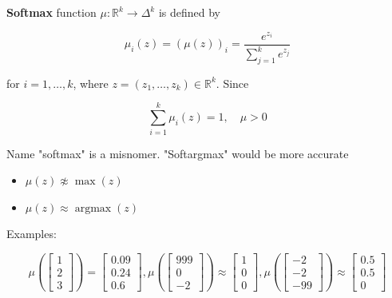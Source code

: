 \begin{definition}
    \textbf{Softmax} function $\mu: \mathbb{R}^{k} \rightarrow \Delta^{k}$ is defined by

    $$
    \mu_{i}(z)=(\mu(z))_{i}=\frac{e^{z_{i}}}{\sum_{j=1}^{k} e^{z_{j}}}
    $$

    for $i=1, \ldots, k$, where $z=\left(z_{1}, \ldots, z_{k}\right) \in \mathbb{R}^{k}$. Since

    $$
    \sum_{i=1}^{k} \mu_{i}(z)=1, \quad \mu>0
    $$

    Name "softmax" is a misnomer. "Softargmax" would be more accurate

    \begin{itemize}
        \item $\mu(z) \not \approx \max (z)$
        \item $\mu(z) \approx \operatorname{argmax}(z)$
    \end{itemize}

    Examples:

    $$
    \mu\left(\left[\begin{array}{l}
    1 \\
    2 \\
    3
    \end{array}\right]\right)=\left[\begin{array}{l}
    0.09 \\
    0.24 \\
    0.6
    \end{array}\right],
    \mu\left(\left[\begin{array}{c}
    999 \\
    0 \\
    -2
    \end{array}\right]\right) \approx\left[\begin{array}{l}
    1 \\
    0 \\
    0
    \end{array}\right],
    \mu\left(\left[\begin{array}{c}
    -2 \\
    -2 \\
    -99
    \end{array}\right]\right) \approx\left[\begin{array}{c}
    0.5 \\
    0.5 \\
    0
    \end{array}\right]
    $$
\end{definition}

